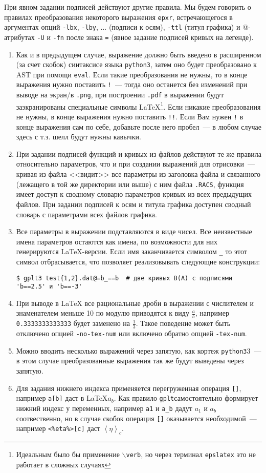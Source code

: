 \documentclass[12pt]{article}
\def\gplt{{\tt gplt}}
\def\python{{\tt python3}}
\def\png{{\tt .png}}
\def\pdf{{\tt .pdf}}
\begin{document}
При явном задании подписей действуют другие правила.
Мы будем говорить о правилах преобразования некоторого выражения \verb'epxr', встречающегося в аргументах опций
\verb'-lbx', \verb'-lby', ... (подписи к осям),  \verb'-ttl' (титул графика) и @-атрибутах \verb'-U' и \verb'-fn' после знака \verb'='
(явное задание подписей кривых на легенде).   
\begin{enumerate}
\item Как и в предыдущем случае, выражение должно быть введено в расширенном (за счет скобок) синтаксисе языка \python,
  затем оно будет преобразовано к AST при помощи \verb'eval'. Если такие преобразования не нужны, то в конце выражения
  нужно поставить \verb'!'~--- тогда оно останется без изменений при выводе на экран/в \png, при построении \pdf{} в выражении
  будут заэкранированы специальные символы \LaTeX{}\footnote{Идеальным было бы применение {\tt $\backslash$verb}, но через терминал {\tt epslatex}
    это не работает в сложных случаях}.  
  Если никакие преобразования не нужны, в конце выражения нужно поставить \verb'!!'. Если Вам нужен \verb'!' в конце выражения сам по себе,
  добавьте после него пробел~--- в любом случае здесь с т.з. шелл будут нужны кавычки.
\item При задании подписей функций и кривых из файлов действуют те же правила относительно параметров, что и при создании выражений для отрисовки~---
  кривая из файла <<видит>> все параметры из заголовка файла и связанного (лежащего в той же директории или выше) с ним файла \verb'.RACS',
  функция имеет доступ к сводному словарю параметров кривых из всех предыдущих файлов. При задании подписей к осям и титула графика
  доступен сводный словарь с параметрами всех файлов графика.
\item Все параметры в выражении подставляются в виде чисел.  Все неизвестные имена параметров остаются как имена, по возможности для них генерируются \LaTeX{}-версии.
  Если имя заканчивается символом \verb'_' то этот символ отбрасывается, что позволяет реализовывать следующие конструкции:
\begin{verbatim}
$ gplt3 test{1,2}.dat@=b_==b  # две кривых B(A) с подписями 'b==2.5' и 'b==-3'
\end{verbatim}
\item   При выводе в \LaTeX{} все рациональные дроби в выражении
  с числителем и знаменателем меньше 10 по модулю приводятся к виду $\frac ab$, например \verb'0.3333333333333' будет заменено на $\frac13$.
  Такое поведение может быть отключено  опцией \verb'-no-tex-num' или включено обратно опцией \verb'-tex-num'.
\item Можно вводить несколько выражений через запятую, как кортеж \python3~--- в этом случае преобразованные выражения так же будут выведены через запятую.
\item Для задания нижнего индекса применяется перегруженная операция \verb'[]', например \verb'a[b]' даст в \LaTeX $a_b$.
  Как правило \gplt самостоятельно формирует нижний индекс у переменных, например \verb'a1' и \verb'a_b' дадут $a_1$ и $a_b$ соотвественно,
  но в случае скобок операция \verb'[]' оказывается необходимой~--- например \verb'<%eta%>[c]' даст $\left<\eta\right>_c$.
\end{enumerate}
\end{document}
